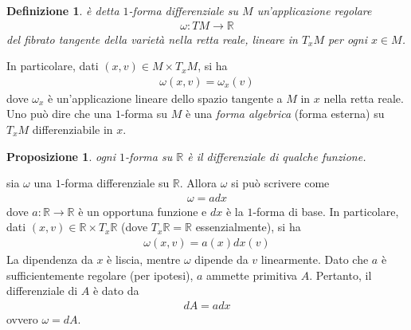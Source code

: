 \documentclass[twoside, 11pt]{amsbook}
\makeatletter
\newcommand{\0}{{(0)}}
\newcommand{\3}{{(3)}}
\theoremstyle{colonplain}
\newtheorem{prop}[thm]{Proposizione}
\theoremstyle{colondefinition}
\newtheorem{defn}[thm]{Definizione}
\theoremstyle{colonremark}
\numberwithin{equation}{chapter}
\renewcommand{\proofname}{Dimostrazione}
\renewenvironment{proof}[1][\proofname]{\par
  \pushQED{\qed}%
  \normalfont \topsep6\p@\@plus6\p@\relax
  \trivlist
  \item[\hskip\labelsep\bfseries #1:]\ignorespaces
}{%
  \popQED\endtrivlist\@endpefalse
}
\makeatother
\begin{document}
\begin{defn} è detta $1$-\textit{forma differenziale} su $M$ un'applicazione regolare
\begin{align}
    \omega : TM \longrightarrow \mathbb{R} 
\end{align}
del fibrato tangente della varietà nella retta reale, lineare in $T_xM$ per ogni $x \in M$.
\end{defn}
In particolare, dati $(x, v) \in M \times T_xM$, si ha 
\begin{align}
    \omega(x, v) = \omega_x(v) 
\end{align}
dove $\omega_x$ è un'applicazione lineare dello spazio tangente a $M$ in $x$ nella retta reale. \\
Uno può dire che una $1$-forma su $M$ è una \textit{forma algebrica} (forma esterna) su $T_xM$ differenziabile in $x$.
\begin{prop} ogni $1$-forma su $\mathbb{R}$ è il differenziale di qualche funzione.
\end{prop}
\begin{proof} sia $\omega$ una $1$-forma differenziale su $\mathbb{R}$. Allora $\omega$ si può scrivere come 
\begin{align}
    \omega = adx 
\end{align}
dove $a : \mathbb{R} \longrightarrow \mathbb{R}$ è un opportuna funzione e $dx$ è la $1$-forma di base. In particolare, dati $(x, v) \in \mathbb{R} \times T_x\mathbb{R}$ (dove $T_x\mathbb{R} = \mathbb{R}$ essenzialmente), si ha 
\begin{align}
    \omega(x, v) = a(x)dx(v)
\end{align}
La dipendenza da $x$ è liscia, mentre $\omega$ dipende da $v$ linearmente. Dato che $a$ è sufficientemente regolare (per ipotesi), $a$ ammette primitiva $A$. Pertanto, il differenziale di $A$ è dato da
\begin{align}
    dA = adx
\end{align}
ovvero $\omega = dA$.
\end{proof}
\end{document}
